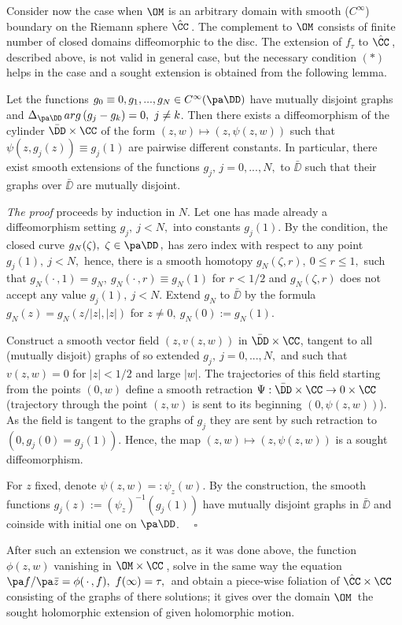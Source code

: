 Consider now the case when $\OM$ is an arbitrary domain with smooth
($C^\infty$) boundary on the Riemann sphere $\hat\CC\,$.
The complement to $\OM$ consists of finite number of closed domains
diffeomorphic to the disc.
The extension of $f_\tau$ to $\hat\CC\,$, described above, is not valid in
general case, but the necessary condition $(*)$ helps in the case and a
sought extension is obtained from the following lemma.

 Let the functions $g_0\equiv 0, g_1,...,g_N\in
C^\infty(\pa\DD)$ have mutually disjoint graphs
and $\Delta_{\pa\DD}\,arg\,(g_j-g_k) =0,\ j\not=k$.
Then there exists a diffeomorphism of the cylinder
$\bar\DD\times\CC$ of the form $(z,w)\mapsto
(z,\psi(z,w))$ such that $\psi(z,g_j(z))\equiv g_j(1)$ are pairwise
different constants.
In particular, there exist smooth extensions of the functions
$g_j,\,j=0,...,N,$ to $\bar\DD$ such that their graphs over
$\bar\DD$ are mutually disjoint.
\endproclaim

{\it The proof\/} proceeds by induction in $N$.
Let one has made already a diffeomorphism setting
$g_j,\ j<N,$ into constants $g_j(1)$.
By the condition, the closed curve $g_N(\zeta),\ \zeta\in\pa\DD\,,$ has
zero index with respect to any point
$g_j(1),\ j<N,$ hence, there is a smooth homotopy
$g_N(\zeta,r),\ 0\le r\le 1,$ such that $g_N(\cdot\,, 1)=g_N,\
g_N(\cdot\,,r)\equiv g_N(1)$ for $r<1/2$ and $g_N(\zeta,r)$ does
not accept any value $g_j(1),\ j<N$.
Extend $g_N$ to $\bar\DD$ by the formula $g_N(z)=g_N(z/|z|,|z|)$ for
$z\not=0,\ g_N(0):=g_N(1)$.

Construct a smooth vector field $(z,v(z,w))$ in $\bar\DD\times\CC$, tangent
to all (mutually disjoit) graphs of so extended
$g_j,\ j=0,...,N,$ and such that $v(z,w)=0$ for
$|z|<1/2$ and large $|w|$.
The trajectories of this field starting from the points
$(0,w)$ define a smooth retraction
$\Psi:\bar\DD\times\CC\rightarrow 0\times\CC\,$ (trajectory through
the point $(z,w)$ is sent to its beginning $(0,\psi(z,w))$).
As the field is tangent to the graphs of
$g_j$ they are sent by such retraction to $(0,g_j(0)=g_j(1))$.
Hence, the map $(z,w)\mapsto (z,\psi (z,w))$ is a sought diffeomorphism.

For $z$ fixed, denote $\psi(z,w)=:\psi_z(w)$.
By the construction, the smooth functions
$g_j(z):=(\psi_z)^{-1}(g_j(1))$ have mutually disjoint graphs in
$\bar\DD$ and coinside with initial one on $\pa\DD$.
$\quad\square$
\smallpagebreak

After such an extension we construct, as it was done above, the function
$\phi(z,w)$ vanishing in $\OM\times\CC\,$, solve in the same way the
equation $\pa f/\pa\bar z=\phi(\,\cdot\,,f),\ f(\infty)=\tau,\,$ and obtain
a piece-wise foliation of $\hat\CC\times\CC\,$ consisting of the
graphs of there solutions; it gives over the domain $\OM\,$ the sought
holomorphic extension of given holomorphic motion.

